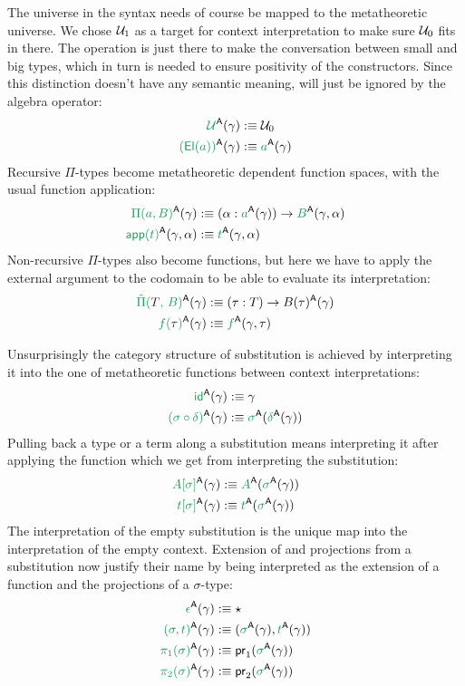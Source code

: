 \begin{defn}
The universe in the syntax needs of course be mapped to the metatheoretic universe.
We chose $\mathcal{U}_1$ as a target for context interpretation to make sure $\mathcal{U}_0$ fits
in there.
The operation \grm{\El} is just there to make the conversation between small and
big types, which in turn is needed to ensure positivity of the constructors.
Since this distinction doesn't have any semantic meaning, \grm{\El} will just be
ignored by the algebra operator:
\begin{align*}
\grm{\UU}^\CC(\gamma) 			&:\equiv \UU_0 \\
\grm{(\El(a))}^\CC(\gamma)		&:\equiv \grm{a}^\CC(\gamma)
\end{align*}
Recursive $\Pi$-types become metatheoretic dependent function spaces, with \grm{\IIapp} the
usual function application:
\begin{align*}
\grm{\Pi(a, B)}^\CC(\gamma)		&:\equiv (\alpha : \grm{a}^\CC(\gamma)) \to \grm{B}^\CC(\gamma, \alpha) \\
\grm{\IIapp(t)}^\CC(\gamma, \alpha)	&:\equiv \grm{t}^\CC(\gamma, \alpha)
\end{align*}
Non-recursive $\Pi$-types also become functions, but here we have to apply the
external argument to the codomain to be able to evaluate its interpretation:
\begin{align*}
\grm{\ExtPi{T}{B}}^\CC(\gamma)		&:\equiv (\tau : T) \to B(\bltau)^\CC(\gamma) \\
\grm{f(\bltau)}^\CC(\gamma)		&:\equiv \grm{f}^\CC(\gamma, \tau)
\end{align*}

Unsurprisingly the category structure of substitution is achieved by interpreting
it into the one of metatheoretic functions between context interpretations:
\begin{align*}
\grm{\id}^\CC(\gamma)			&:\equiv \gamma \\
\grm{(\sigma \circ \delta)}^\CC(\gamma)	&:\equiv \grm{\sigma}^\CC(\grm{\delta}^\CC(\gamma))
\end{align*}
Pulling back a type or a term along a substitution means interpreting it after
applying the function which we get from interpreting the substitution:
\begin{align*}
\grm{A[\sigma]}^\CC(\gamma)		&:\equiv \grm{A}^\CC(\grm{\sigma}^\CC(\gamma)) \\
\grm{t[\sigma]}^\CC(\gamma)		&:\equiv \grm{t}^\CC(\grm{\sigma}^\CC(\gamma))
\end{align*}
The interpretation of the empty substitution is the unique map into the interpretation
of the empty context.
Extension of and projections from a substitution now justify their name by being
interpreted as the extension of a function and the projections of a $\sigma$-type:
\begin{align*}
\grm{\epsilon}^\CC(\gamma)		&:\equiv \star \\
\grm{(\sigma, t)}^\CC(\gamma)		&:\equiv (\grm{\sigma}^\CC(\gamma), \grm{t}^\CC(\gamma)) \\
\grm{\pi_1(\sigma)}^\CC(\gamma)		&:\equiv \pr_1(\grm{\sigma}^\CC(\gamma)) \\
\grm{\pi_2(\sigma)}^\CC(\gamma)		&:\equiv \pr_2(\grm{\sigma}^\CC(\gamma))
\end{align*}


\end{defn}
